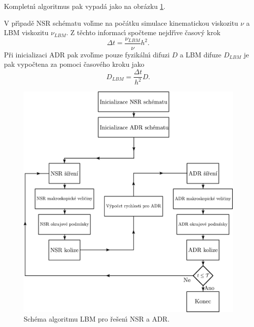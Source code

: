 

        Kompletn\'{\i} algoritmus pak vypad\'{a} jako na obr\'{a}zku \ref{fig:algorithm}.
     

        V p\v{r}\'{\i}pad\v{e} NSR sch\'{e}matu vol\'{\i}me na po\v{c}\'{a}tku simulace kinematickou viskozitu $\nu$ a LBM viskozitu $\nu_{LBM}$. Z t\v{e}chto informac\'{\i} spo\v{c}teme nejd\v{r}\'{\i}ve \v{c}asov\'{y} krok
        \begin{equation}
            \Delta t = \frac{\nu_{LBM}}{\nu}h^2. 
        \end{equation}
        P\v{r}i inicializaci ADR pak zvol\'{\i}me pouze fyzik\'{a}ln\'{\i} difuzi $D$ a LBM difuze $D_{LBM}$ je pak vypo\v{c}tena za pomoci \v{c}asov\'{e}ho kroku jako
        \begin{equation}
            D_{LBM} = \frac{\Delta t}{h^2} D.
        \end{equation}

        \begin{figure}[H]
            \centering
            \includegraphics[width=\linewidth]{Img/Kapitola 2/algorithm.pdf}
            \caption{Sch\'{e}ma algoritmu LBM pro \v{r}e\v{s}en\'{\i} NSR a ADR.}
            \label{fig:algorithm}
        \end{figure}   
        

